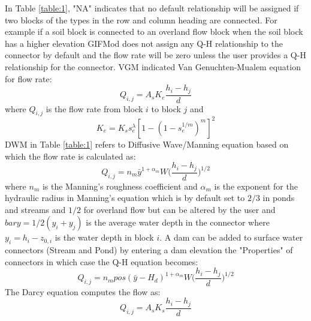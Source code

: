 In Table \ref{table:1}, "NA" indicates that no default relationship will be assigned if two blocks of the types in the row and column heading are connected. For example if a soil block is connected to an overland flow block when the soil block has a higher elevation GIFMod does not assign any Q-H relationship to the connector by default and the flow rate will be zero unless the user provides a Q-H relationship for the connector. VGM indicated Van Genuchten-Mualem equation for flow rate: 
\begin{equation}
\label{eq:1}
Q_{i,j}=A_sK_e\frac{h_i-h_j}{d}
\end{equation}
where $Q_{i,j}$ is the flow rate from block $i$ to block $j$ and 
\begin{equation}
\label{eq:2}
K_e=K_s s_e^{\lambda} [1-(1-s_e^{1/m})^m]^2
\end{equation}
DWM in Table \ref{table:1} refers to Diffusive Wave/Manning equation based on which the flow rate is calculated as: 
\begin{equation}
\label{eq:3}
Q_{i,j}=n_m \bar{y}^{1+\alpha_m}W\big(\frac{h_i-h_j}{d}\big)^{1/2}
\end{equation}
where $n_m$ is the Manning's roughness coefficient and $\alpha_m$ is the exponent for the hydraulic radius in Manning's equation which is by default set to $2/3$ in ponds and streams and $1/2$ for overland flow but can be altered by the user and $bar{y}=1/2(y_i+y_j)$ is the average water depth in the connector where $y_i=h_i-z_{0,i}$ is the water depth in block $i$. 
A dam can be added to surface water connectors (Stream and Pond) by entering a dam elevation the "Properties" of connectors in which case the Q-H equation becomes: 
\begin{equation}
\label{eq:4}
Q_{i,j}=n_m pos(\bar{y}-H_d)^{1+\alpha_m}W\big(\frac{h_i-h_j}{d}\big)^{1/2}
\end{equation}
The Darcy equation computes the flow as: 
\begin{equation}
\label{eq:5}
Q_{i,j}=A_sK_s\frac{h_i-h_j}{d}
\end{equation}
